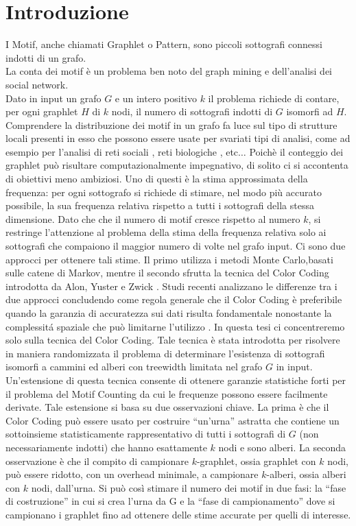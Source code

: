 \chapter{Introduzione}

I Motif, anche chiamati Graphlet o Pattern, sono piccoli sottografi connessi indotti di un grafo.\\
La conta dei motif \`e un problema ben noto del graph mining e dell'analisi dei social network.\\
Dato in input un grafo $G$ e un intero positivo $k$ il problema richiede di contare,  per ogni graphlet $H$ di $k$ nodi, il numero di sottografi indotti di $G$ isomorfi ad $H$.
Comprendere la distribuzione dei motif in un grafo fa luce sul tipo di strutture locali presenti in esso che possono essere usate per svariati tipi di analisi, come ad esempio per l'analisi di reti sociali \cite{bhuiyan2012guise,zhao2010subgraph,boldi2011layered}, reti biologiche \cite{alon2008biomolecular}, etc$ \dots $
Poich\`e il conteggio dei graphlet pu\`o risultare computazionalmente impegnativo, di solito ci si accontenta di obiettivi meno ambiziosi.
Uno di questi \`e la stima approssimata della frequenza: per ogni sottografo si richiede di stimare, nel modo pi\`u accurato possibile, la sua frequenza relativa rispetto a tutti i sottografi della stessa dimensione.
Dato che che il numero di motif  cresce rispetto al numero $ k $, si restringe l'attenzione al problema della stima della frequenza relativa solo ai sottografi che compaiono il maggior numero di volte nel grafo input.
Ci sono due approcci per ottenere tali stime.
Il primo utilizza i metodi Monte Carlo,basati sulle catene di Markov, mentre il secondo sfrutta la tecnica del Color Coding introdotta da Alon, Yuster e Zwick \cite{alon1995color}.
Studi recenti analizzano le differenze tra i due approcci  concludendo come regola generale che il Color Coding \`e preferibile quando  la garanzia di accuratezza sui dati risulta fondamentale nonostante la complessit\'a spaziale che pu\`o limitarne l'utilizzo \cite{bressan2018motif}.
In questa tesi ci concentreremo solo sulla tecnica del Color Coding.
Tale tecnica \`e stata introdotta per risolvere in maniera randomizzata il problema di determinare l'esistenza di sottografi isomorfi a cammini ed alberi con treewidth limitata nel grafo $ G $ in input.
Un'estensione di questa tecnica consente di ottenere garanzie statistiche forti per il problema del Motif Counting da cui le frequenze possono essere facilmente derivate.
Tale estensione si basa su due osservazioni chiave.
La prima \`e che il Color Coding pu\`o essere usato per costruire ``un'urna'' astratta che contiene un sottoinsieme statisticamente rappresentativo di tutti i sottografi di $G$ (non necessariamente indotti) che hanno esattamente $ k $ nodi e sono alberi.
La seconda osservazione \`e che il compito di campionare $ k $-graphlet, ossia graphlet con $ k $ nodi, pu\`o essere ridotto, con un overhead minimale, a campionare $ k $-alberi, ossia alberi con $ k $ nodi, dall'urna.
Si pu\`o cos\`i stimare il numero dei motif in due fasi: la ``fase di costruzione'' in cui si crea l'urna da G e la ``fase di campionamento'' dove si campionano i graphlet fino ad ottenere delle stime accurate per quelli di interesse.


